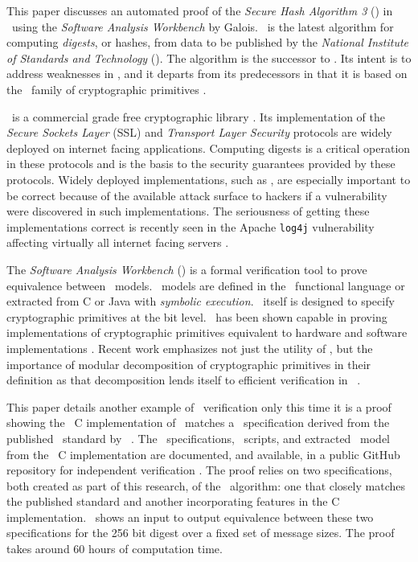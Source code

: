 This paper discusses an automated proof of the \emph{Secure Hash Algorithm 3} (\shaThree) in \openssl\ using the \emph{Software Analysis Workbench} by Galois.
\shaThree\ is the latest algorithm for computing \emph{digests}, or hashes, from data to be published by the \emph{National Institute of Standards and Technology} (\nist).
The algorithm is the successor to \shaTwo.
Its intent is to address weaknesses in \shaTwo, and it departs from its predecessors in that it is based on the \keccak\ family of cryptographic primitives \cite{fips202}.

\openssl\ is a commercial grade free cryptographic library \cite{openssl}.
Its implementation of the \emph{Secure Sockets Layer} (SSL) and \emph{Transport Layer Security} protocols are widely deployed on internet facing applications.
Computing digests is a critical operation in these protocols and is the basis to the security guarantees provided by these protocols.
Widely deployed implementations, such as \openssl, are especially important to be correct because of the available attack surface to hackers if a vulnerability were discovered in such implementations.
The seriousness of getting these implementations correct is recently seen in the Apache \texttt{log4j} vulnerability affecting virtually all internet facing servers \cite{log4j}.

The \emph{Software Analysis Workbench} (\saw) is a formal verification tool to prove equivalence between \sawcore\ models. \sawcore\ models are defined in the \cryptol\ functional language or extracted from C or Java with \emph{symbolic execution}.
\cryptol\ itself is designed to specify cryptographic primitives at the bit level.
\saw\ has been shown capable in proving implementations of cryptographic primitives equivalent to hardware and software implementations \cite{crypt-hi,hard-soft,design-verif}.
Recent work emphasizes not just the utility of \saw, but the importance of modular decomposition of cryptographic primitives in their definition as that decomposition lends itself to efficient verification in \saw\ \cite{nfm-us}. 

This paper details another example of \saw\ verification only this time it is a proof showing the \openssl\ C implementation of \shaThree\ matches a \cryptol\ specification derived from the published \fips\ standard by \nist\ \cite{fips202}.
The \cryptol\ specifications, \saw\ scripts, and extracted \sawcore\ model from the \openssl\ C implementation are documented, and available, in a public GitHub repository for independent verification \cite{sha3proof}.
The proof relies on two specifications, both created as part of this research, of the \shaThree\ algorithm: one that closely matches the published standard and another incorporating features in the C implementation.
\saw\ shows an input to output equivalence between these two specifications for the 256 bit digest over a fixed set of message sizes. The proof takes around 60 hours of computation time.

